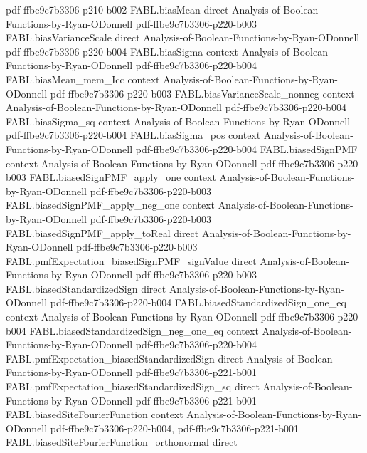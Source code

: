 \begin{theorem}
  {pdf-ffbe9c7b3306-p210-b002}
\proofstep
  {FABL.biasMean}
  {direct}
  {Analysis-of-Boolean-Functions-by-Ryan-ODonnell}
  {pdf-ffbe9c7b3306-p220-b003}
\proofstep
  {FABL.biasVarianceScale}
  {direct}
  {Analysis-of-Boolean-Functions-by-Ryan-ODonnell}
  {pdf-ffbe9c7b3306-p220-b004}
\proofstep
  {FABL.biasSigma}
  {context}
  {Analysis-of-Boolean-Functions-by-Ryan-ODonnell}
  {pdf-ffbe9c7b3306-p220-b004}
\proofstep
  {FABL.biasMean_mem_Icc}
  {context}
  {Analysis-of-Boolean-Functions-by-Ryan-ODonnell}
  {pdf-ffbe9c7b3306-p220-b003}
\proofstep
  {FABL.biasVarianceScale_nonneg}
  {context}
  {Analysis-of-Boolean-Functions-by-Ryan-ODonnell}
  {pdf-ffbe9c7b3306-p220-b004}
\proofstep
  {FABL.biasSigma_sq}
  {context}
  {Analysis-of-Boolean-Functions-by-Ryan-ODonnell}
  {pdf-ffbe9c7b3306-p220-b004}
\proofstep
  {FABL.biasSigma_pos}
  {context}
  {Analysis-of-Boolean-Functions-by-Ryan-ODonnell}
  {pdf-ffbe9c7b3306-p220-b004}
\proofstep
  {FABL.biasedSignPMF}
  {context}
  {Analysis-of-Boolean-Functions-by-Ryan-ODonnell}
  {pdf-ffbe9c7b3306-p220-b003}
\proofstep
  {FABL.biasedSignPMF_apply_one}
  {context}
  {Analysis-of-Boolean-Functions-by-Ryan-ODonnell}
  {pdf-ffbe9c7b3306-p220-b003}
\proofstep
  {FABL.biasedSignPMF_apply_neg_one}
  {context}
  {Analysis-of-Boolean-Functions-by-Ryan-ODonnell}
  {pdf-ffbe9c7b3306-p220-b003}
\proofstep
  {FABL.biasedSignPMF_apply_toReal}
  {direct}
  {Analysis-of-Boolean-Functions-by-Ryan-ODonnell}
  {pdf-ffbe9c7b3306-p220-b003}
\proofstep
  {FABL.pmfExpectation_biasedSignPMF_signValue}
  {direct}
  {Analysis-of-Boolean-Functions-by-Ryan-ODonnell}
  {pdf-ffbe9c7b3306-p220-b003}
\proofstep
  {FABL.biasedStandardizedSign}
  {direct}
  {Analysis-of-Boolean-Functions-by-Ryan-ODonnell}
  {pdf-ffbe9c7b3306-p220-b004}
\proofstep
  {FABL.biasedStandardizedSign_one_eq}
  {context}
  {Analysis-of-Boolean-Functions-by-Ryan-ODonnell}
  {pdf-ffbe9c7b3306-p220-b004}
\proofstep
  {FABL.biasedStandardizedSign_neg_one_eq}
  {context}
  {Analysis-of-Boolean-Functions-by-Ryan-ODonnell}
  {pdf-ffbe9c7b3306-p220-b004}
\proofstep
  {FABL.pmfExpectation_biasedStandardizedSign}
  {direct}
  {Analysis-of-Boolean-Functions-by-Ryan-ODonnell}
  {pdf-ffbe9c7b3306-p221-b001}
\proofstep
  {FABL.pmfExpectation_biasedStandardizedSign_sq}
  {direct}
  {Analysis-of-Boolean-Functions-by-Ryan-ODonnell}
  {pdf-ffbe9c7b3306-p221-b001}
\proofstep
  {FABL.biasedSiteFourierFunction}
  {context}
  {Analysis-of-Boolean-Functions-by-Ryan-ODonnell}
  {pdf-ffbe9c7b3306-p220-b004,
    pdf-ffbe9c7b3306-p221-b001}
\proofstep
  {FABL.biasedSiteFourierFunction_orthonormal}
  {direct}

\end{theorem}
